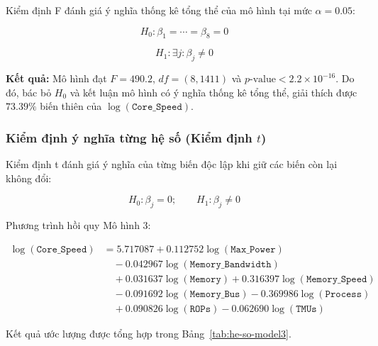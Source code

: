 Kiểm định F đánh giá ý nghĩa thống kê tổng thể của mô hình tại mức $\alpha=0.05$:

\[
H_0:\beta_1=\cdots=\beta_8=0
\]

\[
H_1:\exists j:\beta_j\neq0
\]

\textbf{Kết quả:} Mô hình đạt $F=490.2$, $df=(8,1411)$ và $p\text{-value}<2.2\times10^{-16}$. Do đó, bác bỏ $H_0$ và kết luận mô hình có ý nghĩa thống kê tổng thể, giải thích được $73.39\%$ biến thiên của $\log(\texttt{Core\_Speed})$.

\subsubsection{Kiểm định ý nghĩa từng hệ số (Kiểm định \texorpdfstring{$t$}{t})}

Kiểm định t đánh giá ý nghĩa của từng biến độc lập khi giữ các biến còn lại không đổi:

\[
H_0:\beta_j=0;\qquad H_1:\beta_j\neq0
\]

Phương trình hồi quy Mô hình 3:

\begin{align*}
\log(\texttt{Core\_Speed}) &= 5.717087 + 0.112752\log(\texttt{Max\_Power})\\
&\quad -0.042967\log(\texttt{Memory\_Bandwidth})\\
&\quad +0.031637\log(\texttt{Memory})
+0.316397\log(\texttt{Memory\_Speed})\\
&\quad -0.091692\log(\texttt{Memory\_Bus})
-0.369986\log(\texttt{Process})\\
&\quad +0.090826\log(\texttt{ROPs})
-0.062690\log(\texttt{TMUs})
\end{align*}

Kết quả ước lượng được tổng hợp trong Bảng~\ref{tab:he-so-model3}.

